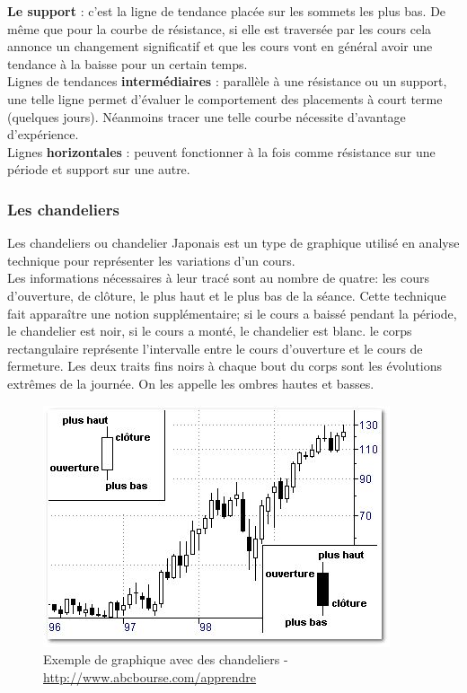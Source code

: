 \textbf{Le support} : c’est la ligne de tendance placée sur les sommets les plus bas. De même que pour la courbe de résistance, si elle est traversée par les cours cela annonce un changement significatif et que les cours vont en général avoir une tendance à la baisse pour un certain temps. \\

Lignes de tendances \textbf{intermédiaires} : parallèle à une résistance ou un support, une telle ligne permet d’évaluer le comportement des placements à court terme (quelques jours). Néanmoins tracer une telle courbe nécessite d’avantage d’expérience.\\

Lignes \textbf{horizontales} : peuvent fonctionner à la fois comme résistance sur une période et support sur une autre. 



\subsubsection{Les chandeliers}
Les chandeliers ou chandelier Japonais est un type de graphique utilisé en analyse technique pour représenter les variations d'un cours. \\

Les informations nécessaires à leur tracé sont au nombre de quatre: les cours d'ouverture, de clôture, le plus haut et le plus bas de la séance. Cette technique fait apparaître une notion supplémentaire; si le cours a baissé pendant la période, le chandelier est noir, si le cours a monté, le chandelier est blanc. le corps rectangulaire représente l'intervalle entre le cours d'ouverture et le cours de fermeture. Les deux traits fins noirs à chaque bout du corps sont les évolutions extrêmes de la journée. On les appelle les ombres hautes et basses. 

\begin{figure}[H]
  \center
  \includegraphics[scale=0.5]{../graph/chandelier.png}
  \caption{Exemple de graphique avec des chandeliers -\url{http://www.abcbourse.com/apprendre}}
\end{figure}

